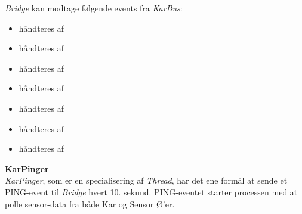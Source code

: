 \textit{Bridge} kan modtage følgende events fra \textit{KarBus}:

\begin{itemize}
\item {} håndteres af 
\item {} håndteres af 
\item {} håndteres af 
\item {} håndteres af 
\item {} håndteres af 
\item {} håndteres af 
\item {} håndteres af 
\end{itemize}

\textbf{KarPinger}\\
\textit{KarPinger}, som er en specialisering af \textit{Thread}, har det ene formål at sende et PING-event til \textit{Bridge} hvert 10. sekund. PING-eventet starter processen med at polle sensor-data fra både Kar og Sensor Ø'er.

